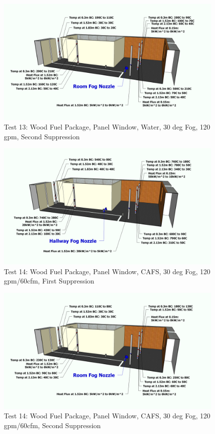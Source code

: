 \documentclass[12pt,oneside]{book}
\begin{document}
\begin{figure}[!ht]
	\includegraphics[width=6in]{../Figures/Pictures/Metric/DelCoFogTest13SecondSuppression}
	\caption{Test 13: Wood Fuel Package, Panel Window, Water, 30 deg Fog, 120 gpm, Second Suppression}
	\label{fig:Test_13_Second_Suppression}
\end{figure}

\begin{figure}[!ht]
	\includegraphics[width=6in]{../Figures/Pictures/Metric/DelCoFogTest14FirstSuppression}
	\caption{Test 14: Wood Fuel Package, Panel Window, CAFS, 30 deg Fog, 120 gpm/60cfm, First Suppression}
	\label{fig:Test_14_First_Suppression}
\end{figure}

\begin{figure}[!ht]
	\includegraphics[width=6in]{../Figures/Pictures/Metric/DelCoFogTest14SecondSuppression}
	\caption{Test 14: Wood Fuel Package, Panel Window, CAFS, 30 deg Fog, 120 gpm/60cfm, Second Suppression}
	\label{fig:Test_14_Second_Suppression}
\end{figure}
\end{document}
